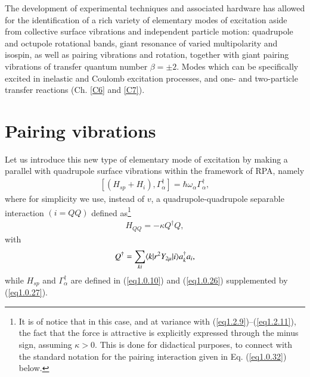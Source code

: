 The development of experimental techniques and associated hardware has allowed for the identification of a rich variety of elementary modes of excitation aside from collective surface vibrations  and independent particle motion: quadrupole and octupole rotational bands, giant resonance of varied multipolarity and isospin, as well as pairing vibrations and rotation, together with giant pairing vibrations of transfer quantum number $\beta=\pm 2$. Modes which can be specifically excited in inelastic and Coulomb excitation processes, and one- and two-particle transfer reactions (Ch. \ref{C6} and \ref{C7}).
\section{Pairing vibrations}\label{Sect1.3}
Let us introduce this new type of elementary mode of excitation by making a parallel with quadrupole surface vibrations within the framework of RPA, namely
\begin{align}\label{eq1.0.29}
\left[(H_{sp}+H_i),\Gamma_{\alpha}^\dagger\right]=\hbar\omega_\alpha\Gamma_{\alpha}^\dagger,
\end{align}
where for simplicity we use, instead of $v$, a quadrupole-quadrupole separable interaction $(i=QQ)$ defined as\footnote{It is of notice that in this case, and at variance with (\ref{eq1.2.9})--(\ref{eq1.2.11}), the fact that the force is attractive is explicitly expressed through the minus sign, assuming $\kappa>0$. This is done for didactical purposes, to connect with the standard notation for the pairing interaction given in Eq. (\ref{eq1.0.32}) below.}
\begin{align}\label{eq1.0.30}
H_{QQ}=-\kappa Q^\dagger Q,
\end{align}
with 
\begin{align}\label{eq1.0.31}
 Q^\dagger=\sum_{ki}\langle {k|r^2 Y_{2\mu}|i} \rangle a^\dagger_k a_i,
\end{align}
while $H_{sp}$ and $\Gamma^\dagger_\alpha$ are defined in (\ref{eq1.0.10}) and (\ref{eq1.0.26}) supplemented by (\ref{eq1.0.27}).

